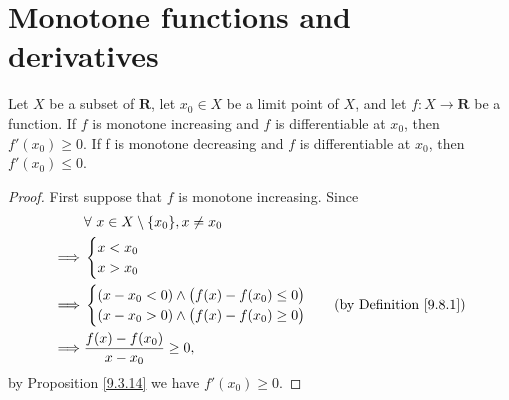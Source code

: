\section{Monotone functions and derivatives}\label{sec 10.3}

\begin{proposition}\label{10.3.1}
    Let \(X\) be a subset of \(\mathbf{R}\), let \(x_0 \in X\) be a limit point of \(X\), and let \(f : X \to \mathbf{R}\) be a function.
    If \(f\) is monotone increasing and \(f\) is differentiable at \(x_0\), then \(f'(x_0) \geq 0\).
    If f is monotone decreasing and \(f\) is differentiable at \(x_0\), then \(f'(x_0) \leq 0\).
\end{proposition}

\begin{proof}
    First suppose that \(f\) is monotone increasing.
    Since
    \begin{align*}
                 & \forall\ x \in X \setminus \{x_0\}, x \neq x_0                                      \\
        \implies & \begin{cases}
            x < x_0 \\
            x > x_0 \\
        \end{cases}                                                           \\
        \implies & \begin{cases}
            (x - x_0 < 0) \land \big(f(x) - f(x_0) \leq 0\big) \\
            (x - x_0 > 0) \land \big(f(x) - f(x_0) \geq 0\big) \\
        \end{cases}                      & \text{(by Definition \ref{9.8.1})} \\
        \implies & \frac{f(x) - f(x_0)}{x - x_0} \geq 0,
    \end{align*}
    by Proposition \ref{9.3.14} we have \(f'(x_0) \geq 0\).


\end{proof}
